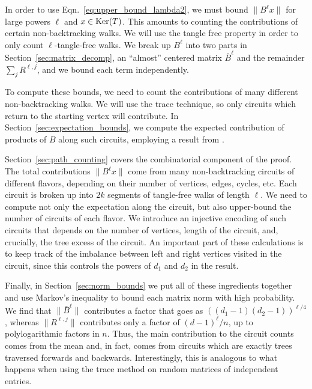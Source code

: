 In order to use Eqn.~\ref{eq:upper_bound_lambda2},
we must bound $\| B^\ell x \|$ for large powers $\ell$
and $x \in \mathrm{Ker}(T)$.
This amounts to counting the contributions of certain non-backtracking walks.
We will use the tangle free property in order to only count
$\ell$-tangle-free walks. 
We break up $B^\ell$ into two parts
in Section~\ref{sec:matrix_decomp}, 
an ``almost'' centered matrix $\bar{B}^\ell$ 
and the remainder $\sum_j R^{\ell,j}$,
and we bound each term independently.

To compute these bounds, 
we need to count the contributions of many different non-backtracking walks.
We will use the trace technique, so only circuits which return to the starting
vertex will contribute. 
In Section~\ref{sec:expectation_bounds},
we compute
the expected contribution of products of $B$ along such circuits, 
employing a result from \cite{bordenave2015}.

Section~\ref{sec:path_counting} covers the combinatorial component of the proof. 
The total contributions $\| B^\ell x \|$ come from many 
non-backtracking circuits of different flavors,
depending on their number of vertices, edges, cycles, etc.
Each circuit is broken up into $2k$ segments of tangle-free
walks of length $\ell$.
We need to compute not only the expectation along the circuit,
but also upper-bound the number of circuits of each flavor.
We introduce an injective
encoding of such circuits that depends on the number of vertices,
length of the circuit, and, crucially, the tree excess of the circuit.
An important part of these calculations is to keep track
of the imbalance between left and right vertices
visited in the circuit, since this controls
the powers of $d_1$ and $d_2$ in the result.

Finally, in Section~\ref{sec:norm_bounds} we put all of these ingredients together
and use Markov's inequality to bound each matrix norm with high probability.
We find that 
$\| \bar{B}^\ell \|$ 
contributes a factor that goes as 
$((d_1 - 1)(d_2 - 1))^{\ell/4}$,
whereas $\| R^{\ell,j} \|$ contributes only a factor of $(d-1)^\ell/n$,
up to polylogarithmic factors in $n$.
Thus, the main contribution to the circuit counts comes from the mean
and, in fact, comes from circuits which are exactly trees traversed 
forwards and backwards.
Interestingly, this
is analogous to what happens when using the trace method
on random matrices of independent entries. 

